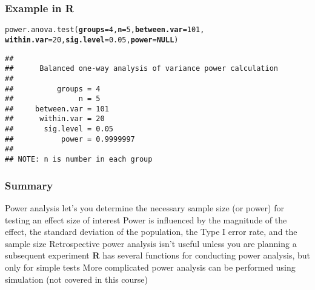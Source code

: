 \documentclass[color=usenames,dvipsnames]{beamer}\usepackage[]{graphicx}\usepackage[]{color}
\makeatletter
\newcommand{\hlnum}[1]{\textcolor[rgb]{0.69,0.494,0}{#1}}%
\newcommand{\hlstd}[1]{\textcolor[rgb]{0,0,0}{#1}}%
\newcommand{\hlkwa}[1]{\textcolor[rgb]{0,0,0}{\textbf{#1}}}%
\newcommand{\hlkwc}[1]{\textcolor[rgb]{0,0,0}{\textbf{#1}}}%
\newcommand{\hlkwd}[1]{\textcolor[rgb]{0.004,0.004,0.506}{#1}}%
\newenvironment{kframe}{%
 \def\at@end@of@kframe{}%
 \ifinner\ifhmode%
  \def\at@end@of@kframe{\end{minipage}}%
  \begin{minipage}{\columnwidth}%
 \fi\fi%
 \def\FrameCommand##1{\hskip\@totalleftmargin \hskip-\fboxsep
 \colorbox{shadecolor}{##1}\hskip-\fboxsep
     \hskip-\linewidth \hskip-\@totalleftmargin \hskip\columnwidth}%
 \MakeFramed {\advance\hsize-\width
   \@totalleftmargin\z@ \linewidth\hsize
   \@setminipage}}%
 {\par\unskip\endMakeFramed%
 \at@end@of@kframe}
\newenvironment{knitrout}{}{} %
\makeatother
\begin{document}
\begin{frame}[fragile]
  \frametitle{Example in {\bf R}}
\begin{knitrout}\footnotesize
{}\color{fgcolor}\begin{kframe}
\begin{alltt}
\hlkwd{power.anova.test}\hlstd{(}\hlkwc{groups}\hlstd{=}\hlnum{4}\hlstd{,} \hlkwc{n}\hlstd{=}\hlnum{5}\hlstd{,} \hlkwc{between.var}\hlstd{=}\hlnum{101}\hlstd{,}
                 \hlkwc{within.var}\hlstd{=}\hlnum{20}\hlstd{,} \hlkwc{sig.level}\hlstd{=}\hlnum{0.05}\hlstd{,} \hlkwc{power}\hlstd{=}\hlkwa{NULL}\hlstd{)}
\end{alltt}
\begin{verbatim}
## 
##      Balanced one-way analysis of variance power calculation 
## 
##          groups = 4
##               n = 5
##     between.var = 101
##      within.var = 20
##       sig.level = 0.05
##           power = 0.9999997
## 
## NOTE: n is number in each group
\end{verbatim}
\end{kframe}
\end{knitrout}
\end{frame}








\begin{frame}
  \frametitle{Summary}
  Power analysis let's you determine the necessary sample size
  (or power) for testing an effect size of interest
  \pause
  \vfill
  Power is influenced by the magnitude of the effect, the
  standard deviation of the population, the Type I error rate, and
  the sample size
  \pause
  \vfill
  Retrospective power analysis isn't useful unless you are
  planning a subsequent experiment
  \pause
  \vfill
  {\bf R} has several functions for conducting power analysis,
  but only for simple tests
  \pause
  \vfill
  More complicated power analysis can be performed using
  simulation (not covered in this course)
\end{frame}
\end{document}
